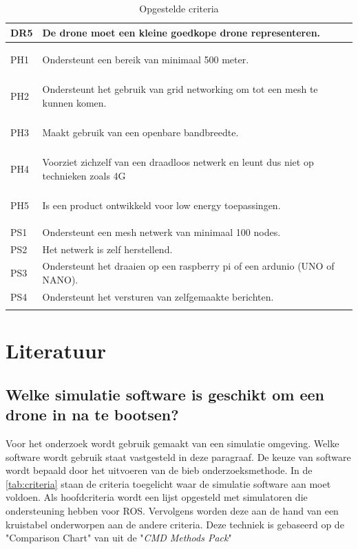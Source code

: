 \documentclass[a4paper, 11pt, oneside]{report}
\begin{document}
\begin{longtable}{|l|l|l|}
		DR5		& De drone moet een kleine goedkope drone representeren.        \\ \hline
		\hypertarget{ph1}{PH1}		& Ondersteunt een bereik van minimaal 500 meter.  \\ \hline
		\hypertarget{ph2}{PH2}		& Ondersteunt het gebruik van grid networking om tot een mesh te kunnen komen.  \\ \hline
		\hypertarget{ph3}{PH3}		& Maakt gebruik van een openbare bandbreedte.\\ \hline
		\hypertarget{ph4}{PH4}		& Voorziet zichzelf van een draadloos netwerk en leunt dus niet op technieken zoals 4G\\ \hline
		\hypertarget{ph5}{PH5}		& Is een product ontwikkeld voor low energy toepassingen. \\ \hline
		PS1		& Ondersteunt een mesh netwerk van minimaal 100 nodes. \\ \hline
		PS2		& Het netwerk is zelf herstellend. \\ \hline
		PS3		& Ondersteunt het draaien op een raspberry pi of een ardunio (UNO of NANO). \\ \hline
		PS4		& Ondersteunt het versturen van zelfgemaakte berichten. \\ \hline
		
	\caption{Opgestelde criteria}
	\label{tab:criteria}
\end{longtable}

\chapter{Literatuur}


\section{Welke simulatie software is geschikt om een drone in na te bootsen?}
\label{sec:welkesim}
Voor het onderzoek wordt gebruik gemaakt van een simulatie omgeving.
Welke software wordt gebruik staat vastgesteld in deze paragraaf.
De keuze van software wordt bepaald door het uitvoeren van de bieb onderzoeksmethode. 
In de \autoref{tab:criteria} staan de criteria toegelicht waar de simulatie software aan moet voldoen.
Als hoofdcriteria wordt een lijst opgesteld met simulatoren die ondersteuning hebben voor ROS.
Vervolgens worden deze aan de hand van een kruistabel onderworpen aan de andere criteria.
Deze techniek is gebaseerd op de "Comparison Chart" van \cite{CMDmethod} uit de "\textit{CMD Methods Pack}"
\end{document}
